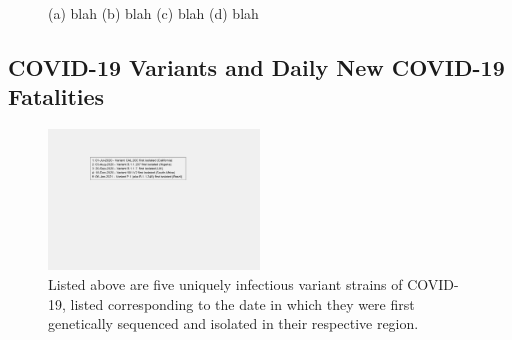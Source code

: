 \documentclass[]{article}
\begin{document}
\begin{figure}
	\caption{(a) blah (b) blah (c) blah (d) blah}
	\label{fig:foobar}
\end{figure}


\FloatBarrier
\vspace{5mm}
\subsection{COVID-19 Variants and Daily New COVID-19 Fatalities}


\begin{figure}[!h]
	\centering
	\includegraphics[width=0.50\textwidth]{legends/variant_strains_legend.png}
	\caption{Listed above are five uniquely infectious variant strains of COVID-19,  listed corresponding to the date in which they were first genetically sequenced and isolated in their respective region.}
	\label{fig:legends/variant_strains_legendLabel}
\end{figure}
\end{document}
